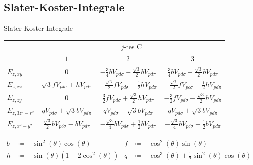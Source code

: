 \documentclass[aspectratio=1610, 9pt]{beamer}
\begin{document}
\subsection{Slater-Koster-Integrale}
\begin{frame}{Slater-Koster-Integrale}
  \begin{table}
    \centering
    \begin{tabular}{l c c c}
    & \multicolumn{3}{c}{$j$-tes C}\\
    \cmidrule(lr){2-4}
    & {$1$} & {$2$} & {$3$} \\
    \midrule
    {$E_{z,xy}$      }  & {$0$}                                               & {$-\frac{3}{4}bV_{pd\sigma} + \frac{\sqrt{3}}{2}bV_{pd\pi}$}          & {$ \frac{3}{4}bV_{pd\sigma}-\frac{\sqrt{3}}{2}bV_{pd\pi}$}         \vspace{0.5cm} \\ 
    {$E_{z,xz}$      }  & {$\sqrt{3}fV_{pd\sigma} + hV_{pd\pi}$}              & {$-\frac{\sqrt{3}}{2}fV_{pd\sigma} - \frac{1}{2} hV_{pd\pi}$}         & {$-\frac{\sqrt{3}}{2}fV_{pd\sigma} - \frac{1}{2} hV_{pd\pi}$}      \vspace{0.5cm} \\
    {$E_{z,zy}$      }  & {$0$}                                               & {$ \frac{3}{2}fV_{pd\sigma}+\frac{\sqrt{3}}{2} hV_{pd\pi}$}           & {$-\frac{3}{2}fV_{pd\sigma}-\frac{\sqrt{3}}{2} hV_{pd\pi}$}        \vspace{0.5cm} \\
    {$E_{z,3z^2-r^2}$}  & {$q V_{pd\sigma}+\sqrt{3}bV_{pd\pi}$}               & {$q V_{pd\sigma}+\sqrt{3}bV_{pd\pi}$}                                 & {$q V_{pd\sigma}+\sqrt{3}bV_{pd\pi}$} \vspace{0.5cm} \\
    {$E_{z,x^2-y^2}$ }  & {$\frac{\sqrt{3}}{2}bV_{pd\sigma}-bV_{pd\pi}$}      & {$-\frac{\sqrt{3}}{4}bV_{pd\sigma}+\frac{1}{2}bV_{pd\pi}$}           & {$-\frac{\sqrt{3}}{4}bV_{pd\sigma}+\frac{1}{2}bV_{pd\pi}$}                       \\ 
    \bottomrule
    \end{tabular}
  \end{table}
  \vspace{0.3cm}
  \begin{equation*}
    \begin{aligned}
b & \coloneq -\sin^2(\theta) \cos(\theta)        & f &  \coloneq -\cos^2(\theta) \sin(\theta)                             \\                     
h & \coloneq -\sin(\theta)(1-2\cos^2(\theta))    & q &  \coloneq -\cos^3(\theta) + \frac{1}{2}\sin^2(\theta) \cos(\theta)
    \end{aligned} \label{eqn:Vorfaktoren}
\end{equation*}
\end{frame}
\end{document}
